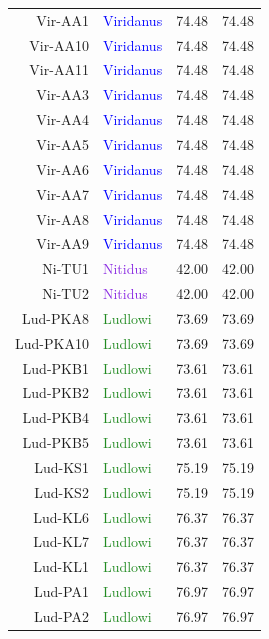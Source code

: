 \documentclass[12pt]{article}
\begin{document}
\begin{table}
\begin{tabular}{rlrr}
   Vir-AA1 & \textcolor{blue}{Viridanus} & 74.48 & 74.48 \\ 
   Vir-AA10 & \textcolor{blue}{Viridanus} & 74.48 & 74.48 \\ 
   Vir-AA11 & \textcolor{blue}{Viridanus} & 74.48 & 74.48 \\ 
   Vir-AA3 & \textcolor{blue}{Viridanus} & 74.48 & 74.48 \\ 
   Vir-AA4 & \textcolor{blue}{Viridanus} & 74.48 & 74.48 \\ 
   Vir-AA5 & \textcolor{blue}{Viridanus} & 74.48 & 74.48 \\ 
   Vir-AA6 & \textcolor{blue}{Viridanus} & 74.48 & 74.48 \\ 
   Vir-AA7 & \textcolor{blue}{Viridanus} & 74.48 & 74.48 \\ 
   Vir-AA8 & \textcolor{blue}{Viridanus} & 74.48 & 74.48 \\ 
   Vir-AA9 & \textcolor{blue}{Viridanus} & 74.48 & 74.48 \\ 
   \hline
   Ni-TU1 & \textcolor{BlueViolet}{Nitidus} & 42.00 & 42.00 \\ 
   Ni-TU2 & \textcolor{BlueViolet}{Nitidus} & 42.00 & 42.00 \\ 
      \hline
   Lud-PKA8 & \textcolor{ForestGreen}{Ludlowi} & 73.69 & 73.69 \\ 
   Lud-PKA10 & \textcolor{ForestGreen}{Ludlowi} & 73.69 & 73.69 \\ 
   Lud-PKB1 & \textcolor{ForestGreen}{Ludlowi} & 73.61 & 73.61 \\ 
   Lud-PKB2 & \textcolor{ForestGreen}{Ludlowi} & 73.61 & 73.61 \\ 
   Lud-PKB4 & \textcolor{ForestGreen}{Ludlowi} & 73.61 & 73.61 \\ 
   Lud-PKB5 & \textcolor{ForestGreen}{Ludlowi} & 73.61 & 73.61 \\ 
   Lud-KS1 & \textcolor{ForestGreen}{Ludlowi} & 75.19 & 75.19 \\ 
   Lud-KS2 & \textcolor{ForestGreen}{Ludlowi} & 75.19 & 75.19 \\ 
   Lud-KL6 & \textcolor{ForestGreen}{Ludlowi} & 76.37 & 76.37 \\ 
   Lud-KL7 & \textcolor{ForestGreen}{Ludlowi} & 76.37 & 76.37 \\ 
   Lud-KL1 & \textcolor{ForestGreen}{Ludlowi} & 76.37 & 76.37 \\ 
   Lud-PA1 & \textcolor{ForestGreen}{Ludlowi} & 76.97 & 76.97 \\ 
   Lud-PA2 & \textcolor{ForestGreen}{Ludlowi} & 76.97 & 76.97 \\ 

\end{tabular}
\end{table}
\end{document}
